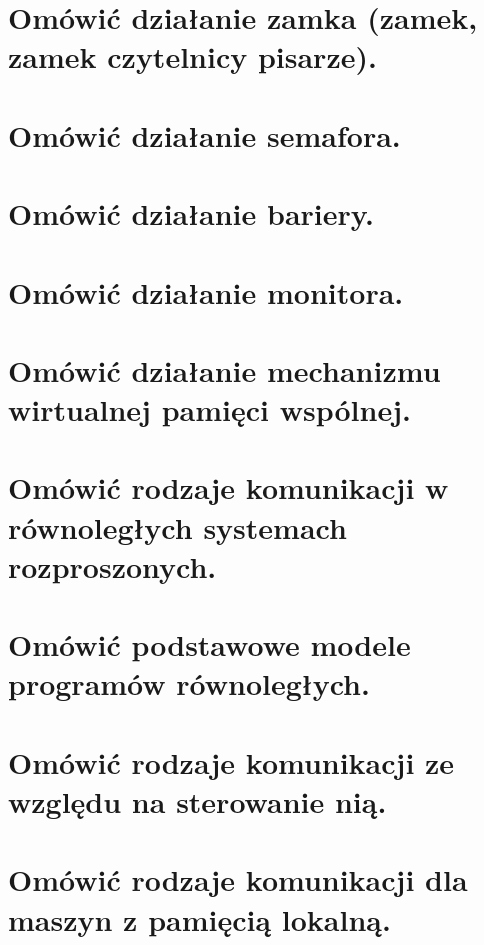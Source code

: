\documentclass[11pt]{article}
\begin{document}
\section{ Omówić działanie zamka (zamek, zamek czytelnicy pisarze).}
\section{Omówić działanie semafora.}
\section{Omówić działanie bariery.}
\section{Omówić działanie monitora.}
\section{Omówić działanie mechanizmu wirtualnej pamięci wspólnej.}
\section{Omówić rodzaje komunikacji w równoległych systemach rozproszonych.}
\section{Omówić podstawowe modele programów równoległych.}
\section{Omówić rodzaje komunikacji ze względu na sterowanie nią.}
\section{Omówić rodzaje komunikacji dla maszyn z pamięcią lokalną.}
\end{document}
